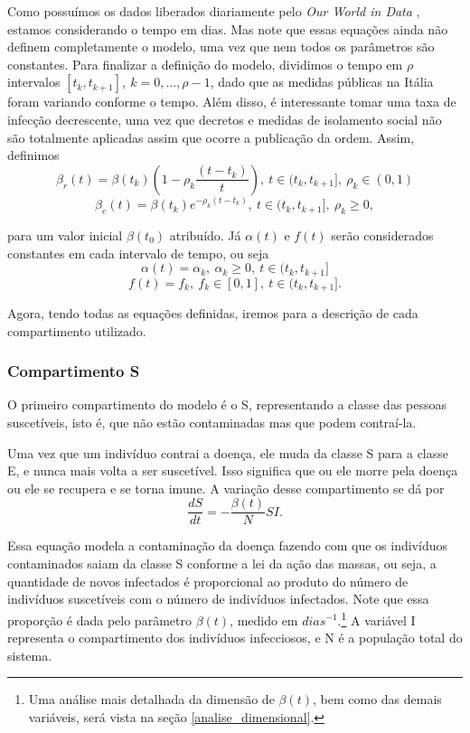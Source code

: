 \documentclass{article}
\begin{document}
Como possuímos os dados liberados diariamente pelo \textit{Our World in Data} \cite{owid}, estamos considerando o tempo em dias. Mas note que essas equações ainda não definem completamente o modelo, uma vez que nem todos os parâmetros são constantes. Para finalizar a definição do modelo, dividimos o tempo em $\rho$ intervalos $[t_k, t_{k + 1}], ~k = 0, \dots, \rho -1$, dado que as medidas públicas na Itália foram variando conforme o tempo. Além disso, é interessante tomar uma taxa de infecção decrescente, uma vez que decretos e medidas de isolamento social não são totalmente aplicadas assim que ocorre a publicação da ordem. Assim, definimos
\[\beta_r(t) = \beta(t_k)\left(1 - \rho_k\dfrac{(t - t_k)}{t}\right), ~t \in (t_k, t_{k + 1}], ~\rho_k \in (0, 1)\]
\[\beta_e(t) = \beta(t_k)e^{- \rho_k(t - t_k)}, ~t \in (t_k, t_{k + 1}], ~\rho_k \geq 0,\]

\noindent para um valor inicial $\beta(t_0)$ atribuído. Já $\alpha(t)$ e $f(t)$ serão considerados constantes em cada intervalo de tempo, ou seja
\[\alpha(t) = \alpha_k, ~\alpha_k \geq 0, ~t \in (t_k, t_{k + 1}]\]
\[f(t) = f_k, ~f_k \in [0, 1], ~t \in (t_k, t_{k + 1}].\]

Agora, tendo todas as equações definidas, iremos para a descrição de cada compartimento utilizado.

\subsubsection{Compartimento S}
O primeiro compartimento do modelo é o S, representando a classe das pessoas suscetíveis, isto é, que não estão contaminadas mas que podem contraí-la.

Uma vez que um indivíduo contrai a doença, ele muda da classe S para a classe E, e nunca mais volta a ser suscetível. Isso significa que ou ele morre pela doença ou ele se recupera e se torna imune. A variação desse compartimento se dá por
\[\dfrac{dS}{dt} = -\dfrac{\beta(t)}{N}SI.\]

Essa equação modela a contaminação da doença fazendo com que os indivíduos contaminados saiam da classe S conforme a lei da ação das massas, ou seja, a quantidade de novos infectados é proporcional ao produto do número de indivíduos suscetíveis com o número de indivíduos infectados. Note que essa proporção é dada pelo parâmetro $\beta(t)$, medido em $dias^{-1}$.\footnote{Uma análise mais detalhada da dimensão de $\beta(t)$, bem como das demais variáveis, será vista na seção \ref{analise_dimensional}.} A variável I representa o compartimento dos indivíduos infecciosos, e N é a população total do sistema.
\end{document}
